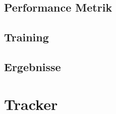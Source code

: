     \subsection{Performance Metrik}
    
    
    \subsection{Training}
    \subsection{Ergebnisse}
\section{Tracker}
